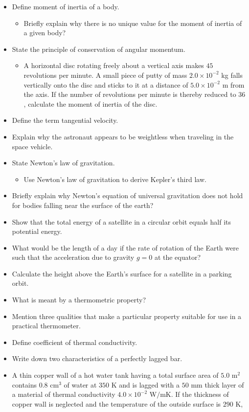 \documentclass{article}
\begin{document}
\begin{itemize}
\item  Define moment of inertia of a body.
 \begin{itemize}
\item Briefly explain why there is no unique value for the moment of inertia of a given body?
\end{itemize}
\item State the principle of conservation of angular momentum. 
 \begin{itemize}
\item A horizontal disc rotating freely about a vertical axis makes $ 45$ revolutions per minute. A small piece of putty of mass $ 2.0\times10^{-2}$ kg falls vertically onto the disc and sticks to it at a distance of $ 5.0\times10^{-2}$ m from the axis. If the number of revolutions per minute is thereby reduced to $ 36$ , calculate the moment of inertia of the disc. 
\end{itemize}
\item Define the term tangential velocity.
\item Explain why the astronaut appears to be weightless when traveling in the space vehicle.
\item State Newton's law of gravitation. 
 \begin{itemize}
\item Use Newton’s law of gravitation to derive Kepler’s third law.
\end{itemize}
\item Briefly explain why Newton’s equation of universal gravitation does not hold for bodies falling near the surface of the earth? 
\item Show that the total energy of a satellite in a circular orbit equals half its potential energy.
\item What would be the length of a day if the rate of rotation of the Earth were such that the acceleration due to gravity $ g=0$ at the equator?
\item Calculate the height above the Earth’s surface for a satellite in a parking orbit.
\item What is meant by a thermometric property?
\item Mention three qualities that make a particular property suitable for use in a practical thermometer.
\item Define coefficient of thermal conductivity.
\item Write down two characteristics of a perfectly lagged bar.
\item A thin copper wall of a hot water tank having a total surface area of $ 5.0$ m$ ^{2}$ contains $ 0.8$ cm$ ^{3}$ of water at $ 350$ K and is lagged with a $ 50$ mm thick layer of a material of thermal conductivity $ 4.0\times10^{-2}$ W$/$mK. If the thickness of copper wall is neglected and the temperature of the outside surface is $ 290$ K,

\end{itemize}
\end{document}

